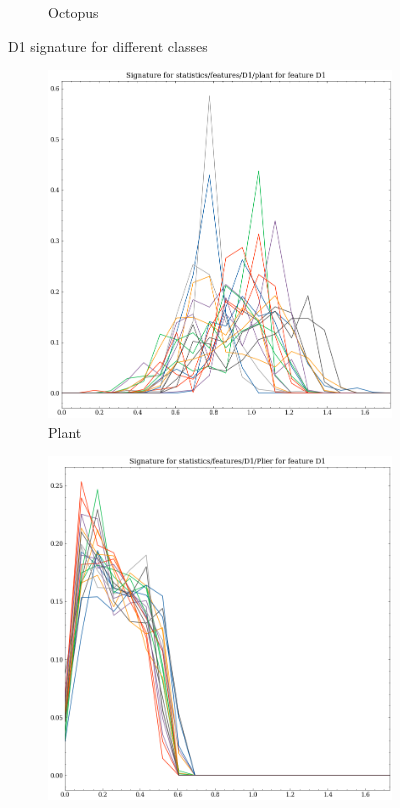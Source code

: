\begin{figure}[t!p]
\begin{subfigure}[b]{0.23\textwidth}
        \caption{Octopus}
        \label{fig:features-statistics-D1-t}    
    \end{subfigure}
    \hfill
    \caption{D1 signature for different classes}
    \label{fig:D1-signatures-1}
\end{figure}

\begin{figure}
    \centering
      \begin{subfigure}[b]{0.23\textwidth}
        \includegraphics[width=\textwidth]{assets/feature_extraction/D1/plant.png}
        \caption{Plant}
        \label{fig:features-statistics-D1-u}    
    \end{subfigure}
    \hfill
    \begin{subfigure}[b]{0.23\textwidth}
        \includegraphics[width=\textwidth]{assets/feature_extraction/D1/Plier.png}

\end{subfigure}
\end{figure}
